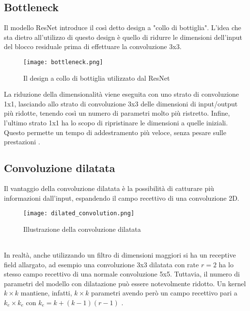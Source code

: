 \subsection{Bottleneck}
Il modello ResNet introduce il così detto design a "collo di bottiglia". L'idea che sta dietro all'utilizzo di questo design è quello di ridurre le dimensioni dell'input del blocco residuale prima di effettuare la convoluzione 3x3.
\begin{figure}[ht]
    \centering
    \texttt{[image: bottleneck.png]}
    \caption[Bottleneck]{Il design a collo di bottiglia utilizzato dal  ResNet \cite{resnet}}
\end{figure}
La riduzione della dimensionalità viene eseguita con uno strato di convoluzione 1x1, lasciando allo strato di convoluzione 3x3 delle dimensioni di input/output più ridotte, tenendo così un numero di parametri molto più ristretto. Infine, l'ultimo strato 1x1 ha lo scopo di ripristinare le dimensioni a quelle iniziali. Questo permette un tempo di addestramento più veloce, senza pesare sulle prestazioni \cite{resnet}.

\subsection{Convoluzione dilatata}
Il vantaggio della convoluzione dilatata è la possibilità di catturare più informazioni dall'input, espandendo il campo recettivo di una convoluzione 2D.
\begin{figure}[ht]
    \centering
    \texttt{[image: dilated\_convolution.png]}
    \caption[Convoluzione dilatata]{Illustrazione della convoluzione dilatata \cite{dilatedconv}}
\end{figure}\\
In realtà, anche utilizzando un filtro di dimensioni maggiori si ha un receptive field allargato, ad esempio una convoluzione 3x3 dilatata con rate $r=2$ ha lo stesso campo recettivo di una normale convoluzione 5x5. Tuttavia, il numero di parametri del modello con dilatazione può essere notevolmente ridotto. Un kernel $k\times k$ mantiene, infatti, $k\times k$ parametri avendo però un campo recettivo pari a $k_e\times k_e$ con $k_e=k+(k-1)(r-1)$ \cite{dilatedconvolution}.

